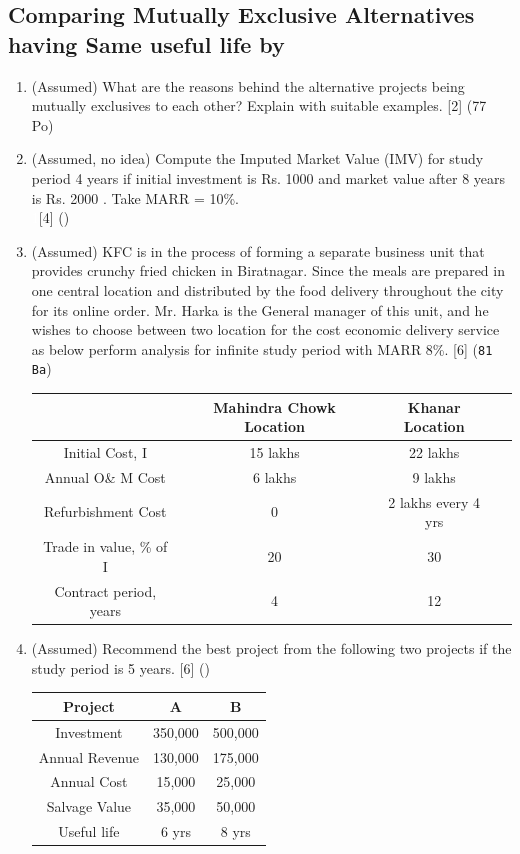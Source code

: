 \documentclass[12pt]{article}
\newcommand{\enter}{\\\textcolor{white}{1}}
\begin{document}
	\subsection{Comparing Mutually Exclusive Alternatives having Same useful life by}
	\begin{enumerate}
		\item (Assumed) What are the reasons behind the alternative projects being mutually exclusives to each other? Explain with suitable examples. \hfill [2] (77 Po)
		
		\item (Assumed, no idea) Compute the Imputed Market Value (IMV) for study period 4 years if initial investment is Rs. 1000 and market value after 8 years is Rs. 2000 . Take MARR = 10\%.
		\enter\hfill [4] ()
		
		\item (Assumed) KFC is in the process of forming a separate business unit that provides crunchy fried chicken in Biratnagar. Since the meals are prepared in one central location and distributed by the food delivery throughout the city for its online order. Mr. Harka is the General manager of this unit, and he wishes to choose between two location for the cost economic delivery service as below perform analysis for infinite study period with MARR 8\%. \hfill [6] (\texttt{81 Ba})\\
		\begin{tabular}{|c|c|c|c|}
			\hline
			& Mahindra Chowk Location & Khanar Location \\ \hline
			Initial Cost, I & 15 lakhs & 22 lakhs \\ \hline
			Annual O\& M Cost & 6 lakhs & 9 lakhs \\ \hline
			Refurbishment Cost & 0 & 2 lakhs every 4 yrs \\ \hline
			Trade in value, \% of I & 20 & 30 \\ \hline
			Contract period, years & 4 & 12 \\ \hline
		\end{tabular}
		
		\item (Assumed) Recommend the best project from the following two projects if the study period is 5 years. \hfill [6] ()\\
		\begin{tabular}{|c|c|c|}
			\hline
			Project & A & B \\ \hline
			Investment & 350,000 & 500,000 \\ \hline
			Annual Revenue & 130,000 & 175,000 \\ \hline
			Annual Cost & 15,000 & 25,000 \\ \hline
			Salvage Value & 35,000 & 50,000 \\ \hline
			Useful life & 6 yrs & 8 yrs \\ \hline
		\end{tabular}
		

\end{enumerate}
\end{document}
